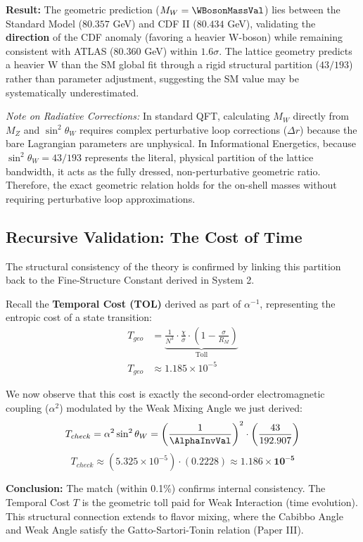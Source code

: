 \textbf{Result:} The geometric prediction ($M_W = \WBosonMassVal$) lies between the Standard Model ($80.357$ GeV) and CDF II ($80.434$ GeV), validating the \textbf{direction} of the CDF anomaly (favoring a heavier W-boson) while remaining consistent with ATLAS ($80.360$ GeV) within $1.6\sigma$. The lattice geometry predicts a heavier W than the SM global fit through a rigid structural partition ($43/193$) rather than parameter adjustment, suggesting the SM value may be systematically underestimated.

\textit{Note on Radiative Corrections:} In standard QFT, calculating $M_W$ directly from $M_Z$ and $\sin^2\theta_W$ requires complex perturbative loop corrections ($\Delta r$) because the bare Lagrangian parameters are unphysical. In Informational Energetics, because $\sin^2\theta_W = 43/193$ represents the literal, physical partition of the lattice bandwidth, it acts as the fully dressed, non-perturbative geometric ratio. Therefore, the exact geometric relation holds for the on-shell masses without requiring perturbative loop approximations.

\subsection{Recursive Validation: The Cost of Time}
The structural consistency of the theory is confirmed by linking this partition back to the Fine-Structure Constant derived in System 2.

Recall the \textbf{Temporal Cost (TOL)} derived as part of $\alpha^{-1}$, representing the entropic cost of a state transition:
\begin{equation}
\begin{split}
    T_{geo} &= \underbrace{\frac{1}{N^3} \cdot \frac{\chi}{\sigma} \cdot \left(1 - \frac{\sigma}{R_M} \right)}_{\text{Toll}} \\
 T_{geo} &\approx 1.185 \times 10^{-5}
\end{split}
\end{equation}

We now observe that this cost is exactly the second-order electromagnetic coupling ($\alpha^2$) modulated by the Weak Mixing Angle we just derived:
\begin{equation}
T_{check} = \alpha^2 \sin^2 \theta_W = \left(\frac{1}{\AlphaInvVal}\right)^2 \cdot \left(\frac{43}{192.907}\right)
\end{equation}
\begin{equation}
T_{check} \approx (5.325 \times 10^{-5}) \cdot (0.2228) \approx \mathbf{1.186 \times 10^{-5}}
\end{equation}

\textbf{Conclusion:} The match (within 0.1\%) confirms internal consistency. The Temporal Cost $T$ is the geometric toll paid for Weak Interaction (time evolution). This structural connection extends to flavor mixing, where the Cabibbo Angle and Weak Angle satisfy the Gatto-Sartori-Tonin relation (Paper III).
